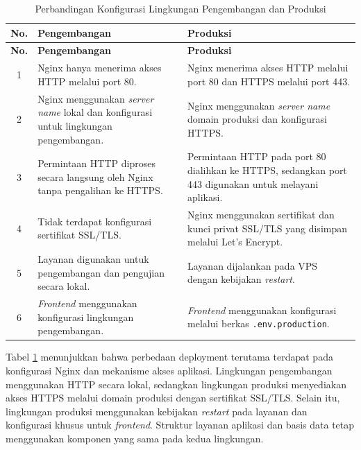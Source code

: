 \begin{longtable}{|c|p{5.5cm}|p{5.5cm}|}
\caption{Perbandingan Konfigurasi Lingkungan Pengembangan dan Produksi}
\label{tab:perbandingan-deployment} \\
\hline
\textbf{No.} & \textbf{Pengembangan} & \textbf{Produksi} \\
\hline
\endfirsthead

\hline
\textbf{No.} & \textbf{Pengembangan} & \textbf{Produksi} \\
\hline
\endhead

1 & Nginx hanya menerima akses HTTP melalui port 80. &
Nginx menerima akses HTTP melalui port 80 dan HTTPS melalui port 443. \\ \hline

2 & Nginx menggunakan \textit{server name} lokal dan konfigurasi untuk lingkungan pengembangan. &
Nginx menggunakan \textit{server name} domain produksi dan konfigurasi HTTPS. \\ \hline

3 & Permintaan HTTP diproses secara langsung oleh Nginx tanpa pengalihan ke HTTPS. &
Permintaan HTTP pada port 80 dialihkan ke HTTPS, sedangkan port 443 digunakan untuk melayani aplikasi. \\ \hline

4 & Tidak terdapat konfigurasi sertifikat SSL/TLS. &
Nginx menggunakan sertifikat dan kunci privat SSL/TLS yang disimpan melalui Let's Encrypt. \\ \hline

5 & Layanan digunakan untuk pengembangan dan pengujian secara lokal. &
Layanan dijalankan pada VPS dengan kebijakan \textit{restart}. \\ \hline

6 & \textit{Frontend} menggunakan konfigurasi lingkungan pengembangan. &
\textit{Frontend} menggunakan konfigurasi melalui berkas \texttt{.env.production}. \\ \hline

\end{longtable}

Tabel \ref{tab:perbandingan-deployment} menunjukkan bahwa perbedaan deployment terutama terdapat pada konfigurasi Nginx dan mekanisme akses aplikasi. Lingkungan pengembangan menggunakan HTTP secara lokal, sedangkan lingkungan produksi menyediakan akses HTTPS melalui domain produksi dengan sertifikat SSL/TLS. Selain itu, lingkungan produksi menggunakan kebijakan \textit{restart} pada layanan dan konfigurasi khusus untuk \textit{frontend}. Struktur layanan aplikasi dan basis data tetap menggunakan komponen yang sama pada kedua lingkungan.

